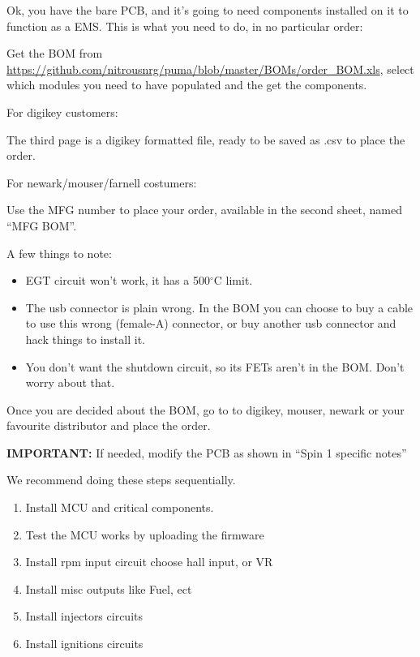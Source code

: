 \documentclass[12pt,a4paper,titlepage]{article}
\begin{document}
Ok, you have the bare PCB, and it's going to need components installed on it to function as a EMS. This is what you need to do, in no particular order:
\newline

Get the BOM from \url{https://github.com/nitrousnrg/puma/blob/master/BOMs/order_BOM.xls}, select which modules you need to have populated and the get the components.
\newline

For digikey customers:

The third page is a digikey formatted file, ready to be saved as .csv to place the order.
\newline

For newark/mouser/farnell costumers:

Use the MFG number to place your order, available in the second sheet, named ``MFG BOM''.



A few things to note:
\begin{itemize}
\item EGT circuit won't work, it has a 500$^{\circ}$C limit.
\item The usb connector is plain wrong. In the BOM you can choose to buy a cable to use this wrong (female-A) connector, or buy another usb connector and hack things to install it.
\item You don't want the shutdown circuit, so its FETs aren't in the BOM. Don't worry about that.
\end{itemize}

Once you are decided about the BOM, go to to digikey, mouser, newark or your favourite distributor and place the order.
\newline

\textbf{IMPORTANT:} If needed, modify the PCB as shown in ``Spin 1 specific notes''
\newline

We recommend doing these steps sequentially.

\begin{enumerate}
\item Install MCU and critical components.
\item Test the MCU works by uploading the firmware
\item Install rpm input circuit choose hall input, or VR
\item Install misc outputs like Fuel, ect
\item Install injectors circuits
\item Install ignitions circuits
\end{enumerate}
\end{document}
